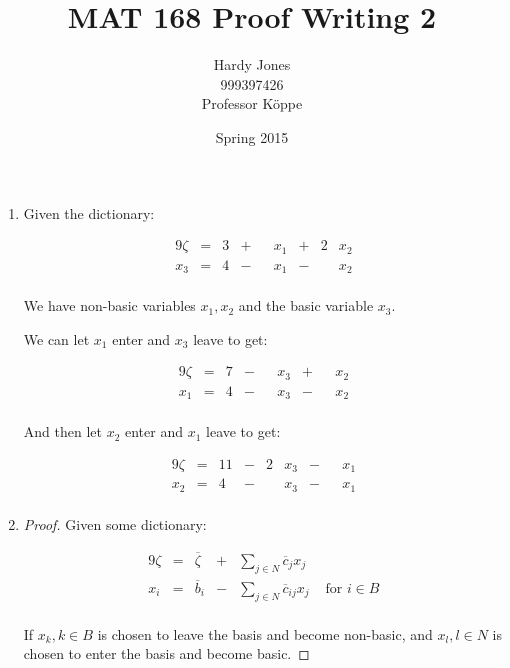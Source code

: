 \documentclass[12pt,letterpaper]{article}
\title{MAT 168 Proof Writing 2\vspace{-2ex}}
\author{Hardy Jones\\
        999397426\\
        Professor K\"{o}ppe\vspace{-2ex}}
\date{Spring 2015}
\begin{document}
  \maketitle

  \begin{enumerate}
    \item
      Given the dictionary:

      \begin{alignat*}{9}
        \zeta  & {}={} & 3 & {}+{} &   & x_1 & {}+{} & 2 & x_2 \\
        x_3    & {}={} & 4 & {}-{} &   & x_1 & {}-{} &   & x_2 \\
      \end{alignat*}

      We have non-basic variables $x_1, x_2$ and the basic variable $x_3$.

      We can let $x_1$ enter and $x_3$ leave to get:

      \begin{alignat*}{9}
        \zeta  & {}={} & 7 & {}-{} &   & x_3 & {}+{} &   & x_2 \\
        x_1    & {}={} & 4 & {}-{} &   & x_3 & {}-{} &   & x_2 \\
      \end{alignat*}

      And then let $x_2$ enter and $x_1$ leave to get:

      \begin{alignat*}{9}
        \zeta  & {}={} & 11 & {}-{} & 2 & x_3 & {}-{} &   & x_1 \\
        x_2    & {}={} & 4  & {}-{} &   & x_3 & {}-{} &   & x_1 \\
      \end{alignat*}
    \item
      \begin{proof}
        Given some dictionary:

        \begin{alignat*}{9}
          \zeta  & {}={} & \overline{\zeta} & {}+{} & \sum_{j \in N} \overline{c}_jx_j    &         \\
          x_i    & {}={} & \overline{b}_i   & {}-{} & \sum_{j \in N} \overline{c}_{ij}x_j & \text{ for } i \in B \\
        \end{alignat*}

        If $x_k, k \in B$ is chosen to leave the basis and become non-basic,
        and $x_l, l \in N$ is chosen to enter the basis and become basic.


\end{proof}
\end{enumerate}
\end{document}
